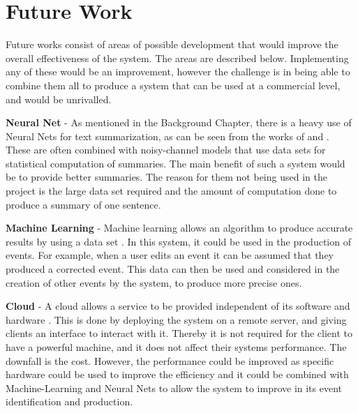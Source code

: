 \section{Future Work}
\par Future works consist of areas of possible development that would improve the overall effectiveness of the system. The areas are described below. Implementing any of these would be an improvement, however the challenge is in being able to combine them all to produce a system that can be used at a commercial level, and would be unrivalled.

\par \textbf{Neural Net} - As mentioned in the Background Chapter, there is a heavy use of Neural Nets for text summarization, as can be seen from the works of \cite{chopraaulirush2016} and \cite{rushchopraweston2015}. These are often combined with noisy-channel models that use data sets for statistical computation of summaries. The main benefit of such a system would be to provide better summaries. The reason for them not being used in the project is the large data set required and the amount of computation done to produce a summary of one sentence.

\par \textbf{Machine Learning} - Machine learning allows an algorithm to produce accurate results by using a data set \cite{machinelearning}. In this system, it could be used in the production of events. For example, when a user edits an event it can be assumed that they produced a corrected event. This data can then be used and considered in the creation of other events by the system, to produce more precise ones.

\par \textbf{Cloud} - A cloud allows a service to be provided independent of its software and hardware \cite{cloud}. This is done by deploying the system on a remote server, and giving clients an interface to interact with it. Thereby it is not required for the client to have a powerful machine, and it does not affect their systems performance. The downfall is the cost. However, the performance could be improved as specific hardware could be used to improve the efficiency and it could be combined with Machine-Learning and Neural Nets to allow the system to improve in its event identification and production.

